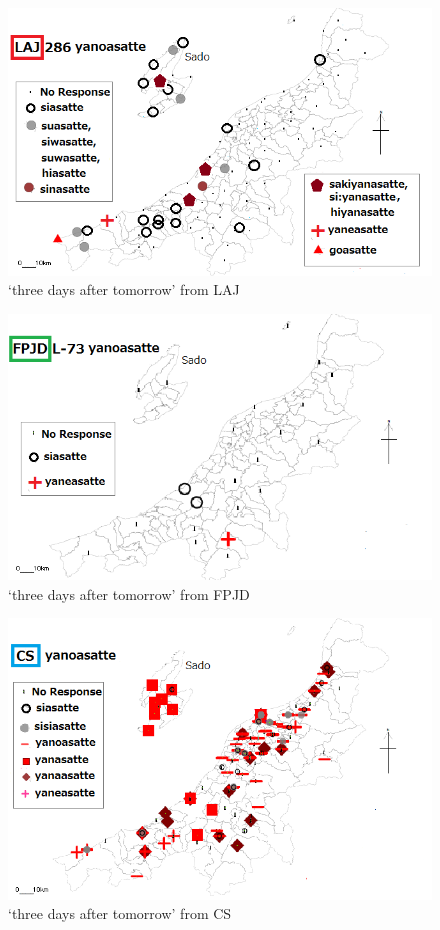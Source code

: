 \documentclass[output=paper]{LSP/langsci}
\begin{document}
\begin{figure}
\includegraphics[width=.75\textwidth]{illustrations/fuku2_fig6a}
\caption{`three days after tomorrow' from LAJ}
\label{fig:6a}
\end{figure}

\begin{figure}
\includegraphics[width=.75\textwidth]{illustrations/fuku2_fig6b}
\caption{`three days after tomorrow' from  FPJD}
\label{fig:6b}
\end{figure}

\begin{figure}
\includegraphics[width=.75\textwidth]{illustrations/fuku2_fig6c}
\caption{`three days after tomorrow' from CS}
\label{fig:6c}
\end{figure}
\end{document}
